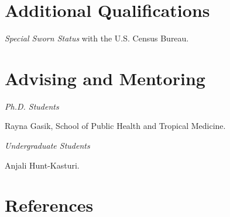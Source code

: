 \documentclass[letterpaper]{article}
\renewenvironment{itemize}{
  \begin{list}{}{
    \setlength{\leftmargin}{1.5em}
  }
}{
  \end{list}
}
\begin{document}
\section*{Additional Qualifications}
\vspace{2 mm}
{\makebox[2.3cm]{\hfill}}\textit{Special Sworn Status} with the U.S. Census Bureau.
\vspace{2 mm}

\section*{Advising and Mentoring}

\textit{Ph.D. Students}
\vspace{2 mm}
\begin{itemize}
\item {} Rayna Gasik, School of Public Health and Tropical Medicine.
\end{itemize}
\vspace{2 mm}
\textit{Undergraduate Students}
\vspace{2 mm}
\begin{itemize}
\item {} Anjali Hunt-Kasturi.
\end{itemize}
\section*{References}
\end{document}
